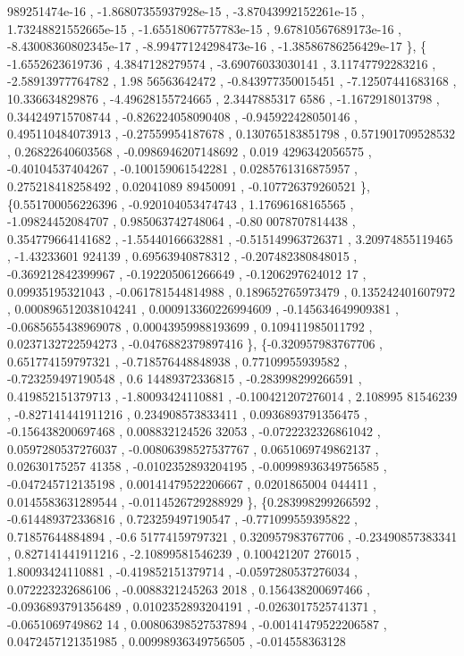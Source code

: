 \begin{DoxyCode}
      989251474e-16 , -1.86807355937928e-15 , -3.87043992152261e-15 , 1.73248821552665e-15 , -1.65518067757783e-15
       , 9.67810567689173e-16 , -8.43008360802345e-17 , -8.99477124298473e-16 , -1.38586786256429e-17 \},
\{ -1.6552623619736 ,   4.3847128279574 , -3.69076033030141 ,  3.11747792283216 , -2.58913977764782 ,   1.98
      56563642472 , -0.843977350015451 , -7.12507441683168 ,   10.336634829876 , -4.49628155724665 ,  2.3447885317
      6586 ,  -1.1672918013798 , 0.344249715708744 , -0.826224058090408 , -0.945922428050146 , 0.495110484073913 ,
       -0.27559954187678 , 0.130765183851798 , 0.571901709528532 ,  0.26822640603568 , -0.0986946207148692 , 0.019
      4296342056575 , -0.40104537404267 , -0.100159061542281 , 0.0285761316875957 , 0.275218418258492 , 0.02041089
      89450091 , -0.107726379260521 \},
\{0.551700056226396 , -0.920104053474743 ,  1.17696168165565 , -1.09824452084707 , 0.985063742748064 , -0.80
      0078707814438 , 0.354779664141682 , -1.55440166632881 , -0.515149963726371 ,  3.20974855119465 , -1.43233601
      924139 ,  0.69563940878312 , -0.207482380848015 , -0.369212842399967 , -0.192205061266649 , -0.1206297624012
      17 ,  0.09935195321043 , -0.061781544814988 , 0.189652765973479 , 0.135242401607972 , 0.000896512038104241 ,
       0.000913360226994609 , -0.145634649909381 , -0.0685655438969078 , 0.00043959988193699 , 0.109411985011792 ,
       0.0237132722594273 , -0.0476882379897416 \},
\{-0.320957983767706 , 0.651774159797321 , -0.718576448848938 ,  0.77109955939582 , -0.723259497190548 , 0.6
      14489372336815 , -0.283998299266591 , 0.419852151379713 , -1.80093424110881 , -0.100421207276014 ,  2.108995
      81546239 , -0.827141441911216 , 0.234908573833411 , 0.0936893791356475 , -0.156438200697468 , 0.008832124526
      32053 , -0.0722232326861042 , 0.0597280537276037 , -0.00806398527537767 , 0.0651069749862137 , 0.02630175257
      41358 , -0.0102352893204195 , -0.00998936349756585 , -0.047245712135198 , 0.00141479522206667 , 0.0201865004
      044411 , 0.0145583631289544 , -0.0114526729288929 \},
\{0.283998299266592 , -0.614489372336816 , 0.723259497190547 , -0.771099559395822 ,  0.71857644884894 , -0.6
      51774159797321 , 0.320957983767706 , -0.23490857383341 , 0.827141441911216 , -2.10899581546239 , 0.100421207
      276015 ,  1.80093424110881 , -0.419852151379714 , -0.0597280537276034 , 0.072223232686106 , -0.0088321245263
      2018 , 0.156438200697466 , -0.0936893791356489 , 0.0102352893204191 , -0.0263017525741371 , -0.0651069749862
      14 , 0.00806398527537894 , -0.00141479522206587 , 0.0472457121351985 , 0.00998936349756505 , -0.014558363128

\end{DoxyCode}
